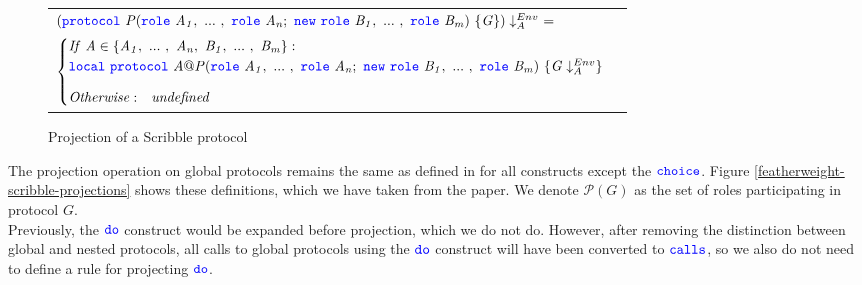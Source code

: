 \documentclass[12pt,twoside]{report}
\begin{document}
\begin{figure}[!h]
    \begin{center}
        \begin{tabular}{l}
            $(\protocol\ \mathit{P}(\rolessig{A}{n};\ \scrnew\ \rolessig{B}{m})\ \{\mathit{G}\})\project\ =$\\[7pt]
            \begin{math}
                \begin{cases}
                    \mathit{If}\ \mathit{A} \in \{\roles{A}{n},\ \roles{B}{m}\}:\\
                    \scrlocal\ \protocol\ \mathit{A@P}(\rolessig{A}{n};\ \scrnew\ \rolessig{B}{m})\ \{\mathit{G} \project\}\\[8pt]
                    \mathit{Otherwise:} \quad \mathit{undefined}
                \end{cases}
            \end{math}
        \end{tabular}
    \end{center}
    \caption{Projection of a Scribble protocol}
    \label{scribble-protocol-projection}
\end{figure}





The projection operation on global protocols remains the same as defined in \cite{featherweight} for all constructs except the ${\color{blue}\mathtt{choice}}$. Figure \ref{featherweight-scribble-projections} shows these definitions, which we have taken from the paper. We denote $\mathcal{P}(G)$ as the set of roles participating in protocol $G$.\\

Previously, the ${\color{blue}\mathtt{do}}$ construct would be expanded before projection, which we do not do. However, after removing the distinction between global and nested protocols, all calls to global protocols using the ${\color{blue}\mathtt{do}}$ construct will have been converted to ${\color{blue}\mathtt{calls}}$, so we also do not need to define a rule for projecting ${\color{blue}\mathtt{do}}$. 
\end{document}
